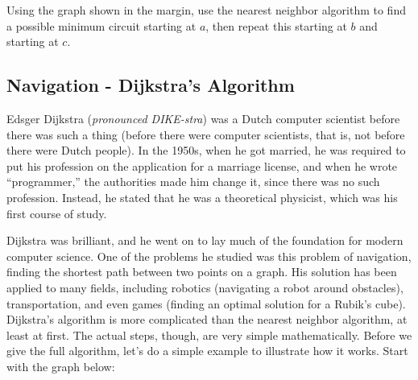 \begin{trynolabel}
Using the graph shown in the margin, use the nearest neighbor algorithm to find a possible minimum circuit starting at $a$, then repeat this starting at $b$ and starting at $c$.
\end{trynolabel}
\pagebreak

\subsection{Navigation - Dijkstra's Algorithm}
Edsger Dijkstra (\emph{pronounced DIKE-stra}) was a Dutch computer scientist before there was such a thing (before there were computer scientists, that is, not before there were Dutch people).  In the 1950s, when he got married, he was required to put his profession on the application for a marriage license, and when he wrote ``programmer,'' the authorities made him change it, since there was no such profession.  Instead, he stated that he was a theoretical physicist, which was his first course of study.

Dijkstra was brilliant, and he went on to lay much of the foundation for modern computer science.  One of the problems he studied was this problem of navigation, finding the shortest path between two points on a graph.  His solution has been applied to many fields, including robotics (navigating a robot around obstacles), transportation, and even games (finding an optimal solution for a Rubik's cube).\\

Dijkstra's algorithm is more complicated than the nearest neighbor algorithm, at least at first.  The actual steps, though, are very simple mathematically.  Before we give the full algorithm, let's do a simple example to illustrate how it works.  Start with the graph below:
\begin{center}
\end{center}


